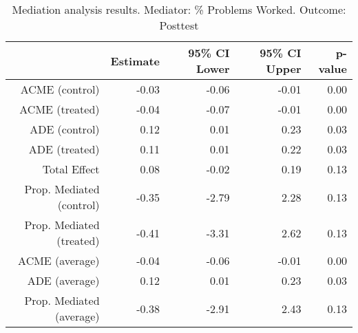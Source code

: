 \begin{table}[ht]
\centering
\begin{tabular}{rrrrr}
  \hline
 & Estimate & 95\% CI Lower & 95\% CI Upper & p-value \\ 
  \hline
ACME (control) & -0.03 & -0.06 & -0.01 & 0.00 \\ 
  ACME (treated) & -0.04 & -0.07 & -0.01 & 0.00 \\ 
  ADE (control) & 0.12 & 0.01 & 0.23 & 0.03 \\ 
  ADE (treated) & 0.11 & 0.01 & 0.22 & 0.03 \\ 
  Total Effect & 0.08 & -0.02 & 0.19 & 0.13 \\ 
  Prop. Mediated (control) & -0.35 & -2.79 & 2.28 & 0.13 \\ 
  Prop. Mediated (treated) & -0.41 & -3.31 & 2.62 & 0.13 \\ 
  ACME (average) & -0.04 & -0.06 & -0.01 & 0.00 \\ 
  ADE (average) & 0.12 & 0.01 & 0.23 & 0.03 \\ 
  Prop. Mediated (average) & -0.38 & -2.91 & 2.43 & 0.13 \\ 
   \hline
\end{tabular}
\caption{Mediation analysis results. Mediator: \% Problems Worked. Outcome: Posttest} 
\end{table}
